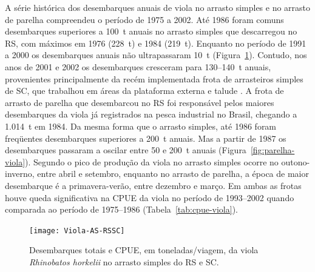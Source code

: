 \documentclass[a4paper,11pt,twoside,showtrims,onecolumn,openright,final]{memoir}
\begin{document}


A série histórica dos desembarques anuais de viola no arrasto simples e no arrasto de parelha
compreendeu o período de 1975 a 2002. Até 1986 foram comuns desembarques superiores a 100~t anuais 
no arrasto simples que descarregou no RS, com máximos em 1976 (228~t) e 1984 (219~t). Enquanto 
no período de 1991 a 2000 os desembarques anuais não 
ultrapassaram 10~t (Figura~\ref{fig:simples-viola}). %
Contudo, nos anos de 2001 e 2002 os desembarques cresceram para 130--140~t anuais, provenientes
principalmente da recém implementada frota de arrasteiros simples de SC, que trabalhou em áreas 
da plataforma externa e talude \citep{univali2003}. A frota de arrasto de parelha que desembarcou 
no RS foi responsável pelos maiores desembarques da viola  já registrados na pesca industrial no Brasil, 
chegando a 1.014~t em 1984. 
Da mesma forma que o arrasto simples, até 1986 foram freqüentes desembarques superiores a 200~t anuais.
Mas a partir de 1987 os desembarques passaram a oscilar 
entre 50 e 200~t anuais (Figura~\ref{fig:parelha-viola}).  %
Segundo \citet{miranda2003} o pico de produção da viola no arrasto simples ocorre no outono-inverno, entre
abril e setembro, enquanto no arrasto de parelha, a época de maior desembarque é a primavera-verão, 
entre dezembro e março.
Em ambas as frotas houve queda significativa na CPUE da viola no período de 1993--2002 quando comparada ao 
período de 1975--1986 (Tabela~\ref{tab:cpue-viola}). 


%
%

\begin{figure}
\begin{center}
\texttt{[image: Viola-AS-RSSC]}
\end{center}
\caption[Desembarques totais e CPUE da viola no arrasto simples do RS e SC.]
        {Desembarques totais e CPUE, em toneladas/viagem, da viola \emph{Rhinobatos horkelii} 
         no arrasto simples do RS e SC.}
\label{fig:simples-viola}
\end{figure}
\end{document}
